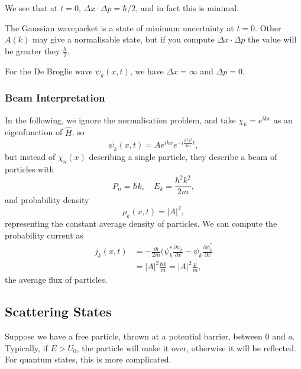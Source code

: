 \documentclass[12pt]{article}
\begin{document}

We see that at $t = 0$, $\Delta x \cdot \Delta p = \hbar/2$, and in fact this is minimal.

The Gaussian wavepacket is a state of minimum uncertainty at $t = 0$. Other $A(k)$ may give a normalisable state, but if you compute $\Delta x \cdot \Delta p$ the value will be greater they $\frac{\hbar}{2}$.

For the De Broglie wave $\psi_k(x, t)$, we have $\Delta x = \infty$ and $\Delta p = 0$.

\subsubsection{Beam Interpretation}%
\label{subsub:beam_interpretation}

In the following, we ignore the normalisation problem, and take $\chi_k = e^{ikx}$ as an eigenfunction of $\hat H$, so
\[
	\psi_k(x, t) = A e^{ikx} e^{-i \frac{\hbar^2 k^2}{2m} t}
,\]
but instead of $\chi_n(x)$ describing a single particle, they describe a beam of particles with
\[
	P_n = \hbar k, \quad E_k = \frac{\hbar^2 k^2}{2m}
,\]
and probability density
\[
	\rho_k(x, t) = |A|^2
,\]
representing the constant average density of particles. We can compute the probability current as
\begin{align*}
	j_k(x, t) &= -\frac{i\hbar}{2m} \biggl( \psi_k^{\ast} \frac{\partial \psi_k}{\partial x} - \psi_k \frac{\partial \psi^{\ast}_k}{\partial x} \\
		  &= |A|^2 \frac{\hbar k}{m} = |A|^2 \frac{p}{m},
\end{align*}
the average flux of particles.

\subsection{Scattering States}%
\label{sub:scattering_states}

Suppose we have a free particle, thrown at a potential barrier, between $0$ and $a$. Typically, if $E > U_0$, the particle will make it over, otherwise it will be reflected. For quantum states, this is more complicated.
\end{document}
